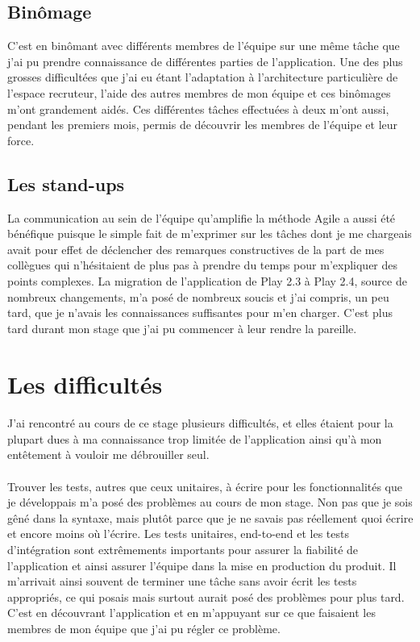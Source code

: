 \subsection{Binômage}
C'est en binômant avec différents membres de l'équipe sur une même tâche que j'ai pu prendre connaissance de différentes parties de l'application.
Une des plus grosses difficultées que j'ai eu étant l'adaptation à l'architecture particulière de l'espace recruteur, l'aide des autres membres de mon équipe et ces binômages m'ont grandement aidés.
Ces différentes tâches effectuées à deux m'ont aussi, pendant les premiers mois, permis de découvrir les membres de l'équipe et leur force.
\subsection{Les stand-ups}
La communication au sein de l'équipe qu'amplifie la méthode Agile a aussi été bénéfique puisque le simple fait de m'exprimer sur les tâches dont je me chargeais avait pour effet de déclencher des remarques constructives de la part de mes collègues qui n'hésitaient de plus pas à prendre du temps pour m'expliquer des points complexes.
La migration de l'application de Play 2.3 à Play 2.4, source de nombreux changements, m'a posé de nombreux soucis et j'ai compris, un peu tard, que je n'avais les connaissances suffisantes pour m'en charger.
C'est plus tard durant mon stage que j'ai pu commencer à leur rendre la pareille.

\section{Les difficultés}
\paragraph{}
J'ai rencontré au cours de ce stage plusieurs difficultés, et elles étaient pour la plupart dues à ma connaissance trop limitée de l'application ainsi qu'à mon entêtement à vouloir me débrouiller seul.
\paragraph{}
Trouver les tests, autres que ceux unitaires, à écrire pour les fonctionnalités que je développais m'a posé des problèmes au cours de mon stage.
Non pas que je sois gêné dans la syntaxe, mais plutôt parce que je ne savais pas réellement quoi écrire et encore moins où l'écrire.
Les tests unitaires, end-to-end et les tests d'intégration sont extrêmements importants pour assurer la fiabilité de l'application et ainsi assurer l'équipe dans la mise en production du produit.
Il m'arrivait ainsi souvent de terminer une tâche sans avoir écrit les tests appropriés, ce qui posais mais surtout aurait posé des problèmes pour plus tard.
C'est en découvrant l'application et en m'appuyant sur ce que faisaient les membres de mon équipe que j'ai pu régler ce problème.
